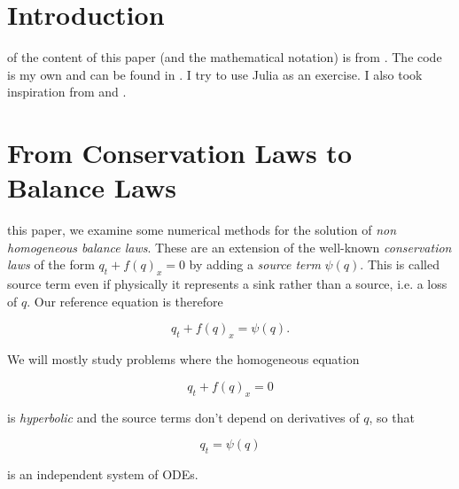 \documentclass[journal,onecolumn]{IEEEtran}
\begin{document}
\section {Introduction}

 of the content of this paper (and the mathematical notation) is from \cite{leveque}. The code is my own and can be found in \cite{github}. I try to use Julia as an exercise. I also took inspiration from \cite {clawpack} and \cite {riemann}.

\section{From Conservation Laws to Balance Laws}
 this paper, we examine some numerical methods for the solution of \textit{non homogeneous balance laws}. These are an extension of the well-known \textit{conservation laws} of the form $q_t+f(q)_x=0$ by adding a \textit{source term} $\psi(q)$. This is called source term even if physically it represents a sink rather than a source, i.e. a loss of $q$. Our reference equation is therefore

\begin{equation} \label{eq:template}
	q_t + f(q)_x = \psi(q).
\end{equation}

We will mostly study problems where the homogeneous equation

\begin{equation} \label{eq:hom}
	q_t +f(q)_x = 0
\end{equation}

is \textit{hyperbolic} and the source terms don't depend on derivatives of $q$, so that

\begin{equation} \label{eq:source}
	q_t = \psi(q)
\end{equation}

is an independent system of ODEs.




\end{document}

